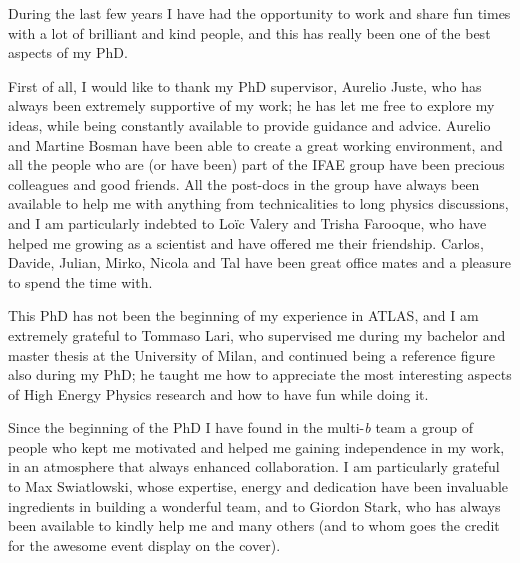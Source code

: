 \par\bigskip  
\par\bigskip

During the last few years I have had the opportunity to work and share fun times with a lot 
of brilliant and kind people, and this has really been one of the best aspects of my PhD. 

\par\medskip 

First of all, I would like to thank my PhD supervisor, Aurelio Juste, who has always been 
extremely supportive of my work; 
he has let me free to explore my ideas, while being constantly available to provide guidance and advice. 
Aurelio and Martine Bosman have been able to create a great working environment, and 
all the people who are (or have been) part of the IFAE group have been precious colleagues and 
good friends.  
All the post-docs in the group have always been available to help me with 
anything from technicalities to long physics discussions, 
and I am particularly indebted to Lo\"ic Valery and Trisha Farooque, who have helped me growing as a scientist and have offered me 
their friendship. 
Carlos, Davide, Julian, Mirko, Nicola and Tal have been great office mates 
and a pleasure to spend the time with. 
 
\par\medskip 

This PhD has not been the beginning of my experience in ATLAS, and I am extremely grateful to 
Tommaso Lari, who supervised me during my bachelor and master thesis at the University of Milan, 
and continued being a reference figure also during my PhD; 
he taught me how to appreciate the most interesting aspects of High Energy Physics research 
and how to have fun while doing it.   

\par\medskip 

Since the beginning of the PhD I have found in the multi-\textit{b} team a 
group of people who kept me motivated and helped me 
gaining independence in my work, 
in an atmosphere that always enhanced collaboration. %
I am particularly grateful to Max Swiatlowski, whose expertise, energy and dedication have been 
invaluable ingredients in building a wonderful team, 
and to Giordon Stark, who has always been available to kindly help me and many others (and 
to whom goes the credit for the awesome event display on the cover). 


